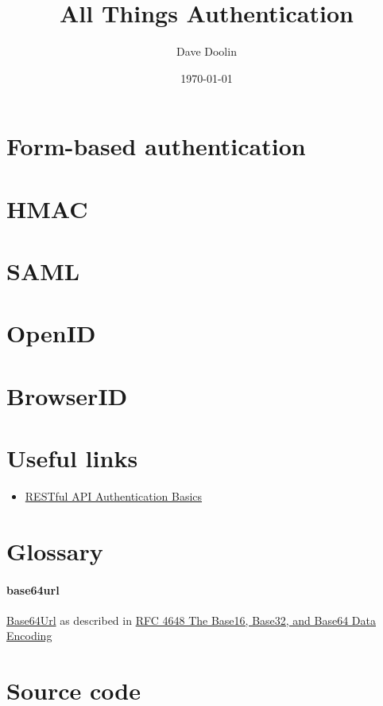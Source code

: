 \documentclass{article}
\title{All Things Authentication}
\date{\today}
\author{Dave Doolin}
\begin{document}
\maketitle
\tableofcontents









\section{Form-based authentication}
\section{HMAC}
\section{SAML}
\section{OpenID}
\section{BrowserID}

\appendix

\section{Useful links}

\begin{itemize}
  \item \href{https://blog.restcase.com/restful-api-authentication-basics/}{%
      RESTful API Authentication Basics}
\end{itemize}

\section{Glossary}

\paragraph{base64url} \href{https://en.wikipedia.org/wiki/Base64#URL_applications}{%
  Base64Url} as described in \href{https://tools.ietf.org/html/rfc4648}{%
    RFC 4648 The Base16, Base32, and Base64 Data Encoding}

\section{Source code}
\end{document}
